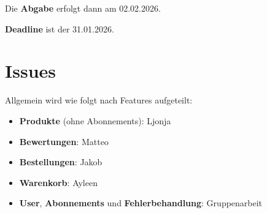 \documentclass[12pt, a4paper]{scrreprt}
\begin{document}
			Die \textbf{Abgabe} erfolgt dann am 02.02.2026.
			
			\textbf{Deadline} ist der 31.01.2026.
			
		\section{Issues}
		
		Allgemein wird wie folgt nach Features aufgeteilt:
		\begin{itemize}
			\item \textbf{Produkte} (ohne Abonnements): Ljonja
			\item \textbf{Bewertungen}: Matteo
			\item \textbf{Bestellungen}: Jakob
			\item \textbf{Warenkorb}: Ayleen
			\item \textbf{User}, \textbf{Abonnements} und \textbf{Fehlerbehandlung}: Gruppenarbeit 
		\end{itemize}
		
\end{document}
